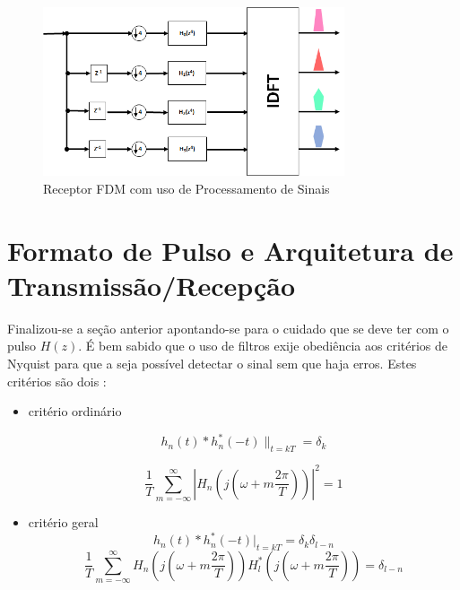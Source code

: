 \begin{figure}[h!]
\centering
\includegraphics[width=3.5in]{estrutura_comp.png} %
\caption{Receptor FDM com uso de Processamento de Sinais \cite{Krishna}}
\label{estrutura_completa}
\end{figure}


\section{Formato de Pulso e Arquitetura de Transmissão/Recepção}

Finalizou-se a seção anterior apontando-se para o cuidado que se deve ter com o pulso $H(z)$. É bem sabido que o uso de filtros exije obediência aos critérios de Nyquist para que a seja possível detectar o sinal sem que haja erros. Estes critérios são dois \cite{Saeed}:

\begin{itemize}
\item critério ordinário 

\begin{equation}
h_{n}(t)\ast h_{n}^{\ast}(-t)\|_{t=kT} = \delta_{k} 
\end{equation}

\begin{equation}
\frac{1}{T}\sum_{m = -\infty}^{\infty}|H_{n}(j(\omega + m \frac{2 \pi}{T}))|^{2} = 1
\end{equation}

\item critério geral
\begin{equation}
h_{n}(t)\ast h_{n}^{*}(-t)|_{t=kT} = \delta_{k}\delta_{l-n} 
\end{equation}
\begin{equation}
\frac{1}{T}\sum_{m = -\infty}^{\infty}H_{n}(j(\omega + m \frac{2 \pi}{T}))H_{l}^{*}(j(\omega + m \frac{2 \pi}{T})) = \delta_{l-n}
\end{equation}

\end{itemize}
 

